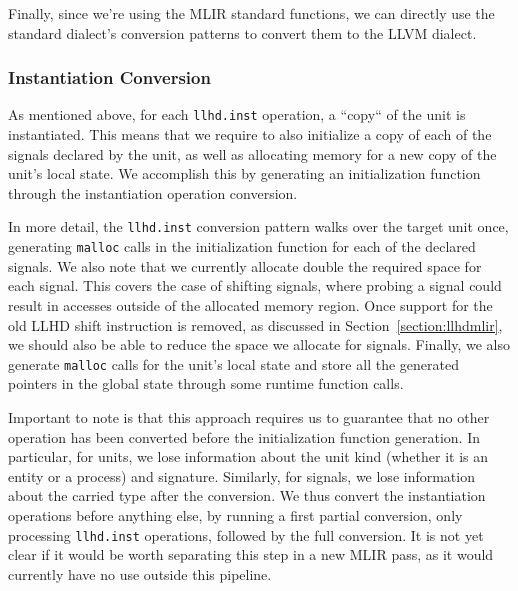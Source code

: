 Finally, since we're using the MLIR standard functions, we can directly use the standard dialect's conversion patterns to convert them to the LLVM dialect.


\subsubsection{Instantiation Conversion}
As mentioned above, for each \texttt{llhd.inst} operation, a “copy“ of the unit is instantiated. This means that we require to also initialize a copy of each of the signals declared by the unit, as well as allocating memory for a new copy of the unit's local state. We accomplish this by generating an initialization function through the instantiation operation conversion.

In more detail, the \texttt{llhd.inst} conversion pattern walks over the target unit once,  generating \texttt{malloc} calls in the initialization function for each of the declared signals. We also note that we currently allocate double the required space for each signal. This covers the case of shifting signals, where probing a signal could result in accesses outside of the allocated memory region. Once support for the old LLHD shift instruction is removed, as discussed in Section~\ref{section:llhdmlir}, we should also be able to reduce the space we allocate for signals.
Finally, we also generate \texttt{malloc} calls for the unit's local state and store all the generated pointers in the global state through some runtime function calls.

Important to note is that this approach requires us to guarantee that no other operation has been converted before the initialization function generation. In particular, for units, we lose information about the unit kind (whether it is an entity or a process) and signature. Similarly, for signals, we lose information about the carried type after the conversion. We thus convert the instantiation operations before anything else, by running a first partial conversion, only processing \texttt{llhd.inst} operations, followed by the full conversion. It is not yet clear if it would be worth separating this step in a new MLIR pass, as it would currently have no use outside this pipeline.

